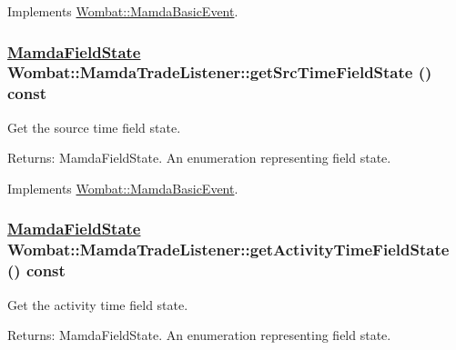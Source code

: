 Implements \hyperlink{classWombat_1_1MamdaBasicEvent_c361c99af2cf7eb9f5621d89f744fc62}{Wombat::Mamda\-Basic\-Event}.\hypertarget{classWombat_1_1MamdaTradeListener_a228f95b1fd47f62b1d57e88c6b6482a}{
\subsubsection[getSrcTimeFieldState]{\setlength{\rightskip}{0pt plus 5cm}\hyperlink{namespaceWombat_93aac974f2ab713554fd12a1fa3b7d2a}{Mamda\-Field\-State} Wombat::Mamda\-Trade\-Listener::get\-Src\-Time\-Field\-State () const}}
\label{classWombat_1_1MamdaTradeListener_a228f95b1fd47f62b1d57e88c6b6482a}


Get the source time field state. 

\begin{Desc}
\item[Returns:]Mamda\-Field\-State. An enumeration representing field state. \end{Desc}


Implements \hyperlink{classWombat_1_1MamdaBasicEvent_9cd58f3d7b5ebea42fa86e5dde46ab18}{Wombat::Mamda\-Basic\-Event}.\hypertarget{classWombat_1_1MamdaTradeListener_a43ecdb29f836cb0176ca473515de915}{
\subsubsection[getActivityTimeFieldState]{\setlength{\rightskip}{0pt plus 5cm}\hyperlink{namespaceWombat_93aac974f2ab713554fd12a1fa3b7d2a}{Mamda\-Field\-State} Wombat::Mamda\-Trade\-Listener::get\-Activity\-Time\-Field\-State () const}}
\label{classWombat_1_1MamdaTradeListener_a43ecdb29f836cb0176ca473515de915}


Get the activity time field state. 

\begin{Desc}
\item[Returns:]Mamda\-Field\-State. An enumeration representing field state. \end{Desc}


